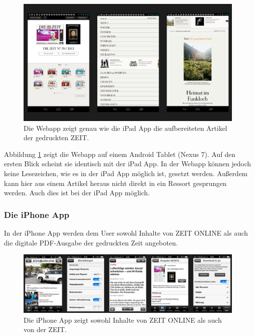 \documentclass[12pt,a4paper,bibtotoc,abstracton]{scrartcl}
\begin{document}
\begin{figure}[h]	
	\centering
	\includegraphics[width=\textwidth]{Bilder/Screenshots/android-webapp/webapp.png} 
	\caption[Die Webapp]{Die Webapp zeigt genau wie die iPad App die aufbereiteten Artikel der gedruckten ZEIT.}
	\label{fig:webapp}
\end{figure}

Abbildung \ref{fig:webapp} zeigt die Webapp auf einem Android Tablet (Nexus 7). Auf den ersten Blick scheint sie identisch mit der iPad App. In der Webapp können jedoch keine Lesezeichen, wie es in der iPad App möglich ist, gesetzt werden. Außerdem kann hier aus einem Artikel heraus nicht direkt in ein Ressort gesprungen werden. Auch dies ist bei der iPad App möglich.

\subsubsection{Die iPhone App}
\label{subsubsec:iphoneapp}
In der iPhone App werden dem User sowohl Inhalte von ZEIT ONLINE als auch die digitale PDF-Ausgabe der gedruckten Zeit angeboten.

\begin{figure}[h]	
	\centering
	\includegraphics[width=\textwidth]{Bilder/Screenshots/iPhoneApp/iPhone.png} 
	\caption[Die iPhone App]{Die iPhone App zeigt sowohl Inhalte von ZEIT ONLINE als auch von der ZEIT.}
	\label{fig:iphoneapp}
\end{figure}
\end{document}
